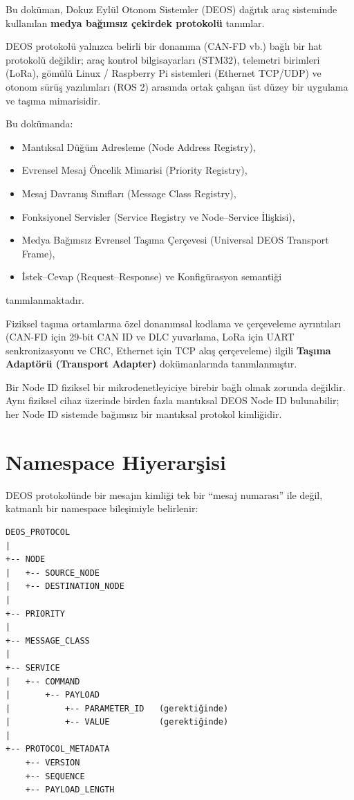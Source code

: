 \documentclass[a4paper,10pt]{article}
\begin{document}
Bu doküman, Dokuz Eylül Otonom Sistemler (DEOS) dağıtık araç sisteminde kullanılan \textbf{medya bağımsız çekirdek protokolü} tanımlar.

DEOS protokolü yalnızca belirli bir donanıma (CAN-FD vb.) bağlı bir hat protokolü değildir; araç kontrol bilgisayarları (STM32), telemetri birimleri (LoRa), gömülü Linux / Raspberry Pi sistemleri (Ethernet TCP/UDP) ve otonom sürüş yazılımları (ROS 2) arasında ortak çalışan üst düzey bir uygulama ve taşıma mimarisidir.

Bu dokümanda:
\begin{itemize}
    \item Mantıksal Düğüm Adresleme (Node Address Registry),
    \item Evrensel Mesaj Öncelik Mimarisi (Priority Registry),
    \item Mesaj Davranış Sınıfları (Message Class Registry),
    \item Fonksiyonel Servisler (Service Registry ve Node--Service İlişkisi),
    \item Medya Bağımsız Evrensel Taşıma Çerçevesi (Universal DEOS Transport Frame),
    \item İstek--Cevap (Request--Response) ve Konfigürasyon semantiği
\end{itemize}
tanımlanmaktadır.

Fiziksel taşıma ortamlarına özel donanımsal kodlama ve çerçeveleme ayrıntıları (CAN-FD için 29-bit CAN ID ve DLC yuvarlama, LoRa için UART senkronizasyonu ve CRC, Ethernet için TCP akış çerçeveleme) ilgili \textbf{Taşıma Adaptörü (Transport Adapter)} dokümanlarında tanımlanmıştır.

Bir Node ID fiziksel bir mikrodenetleyiciye birebir bağlı olmak zorunda değildir. Aynı fiziksel cihaz üzerinde birden fazla mantıksal DEOS Node ID bulunabilir; her Node ID sistemde bağımsız bir mantıksal protokol kimliğidir.

\section{Namespace Hiyerarşisi}

DEOS protokolünde bir mesajın kimliği tek bir ``mesaj numarası'' ile değil, katmanlı bir namespace bileşimiyle belirlenir:

\begin{verbatim}
DEOS_PROTOCOL
|
+-- NODE
|   +-- SOURCE_NODE
|   +-- DESTINATION_NODE
|
+-- PRIORITY
|
+-- MESSAGE_CLASS
|
+-- SERVICE
|   +-- COMMAND
|       +-- PAYLOAD
|           +-- PARAMETER_ID   (gerektiğinde)
|           +-- VALUE          (gerektiğinde)
|
+-- PROTOCOL_METADATA
    +-- VERSION
    +-- SEQUENCE
    +-- PAYLOAD_LENGTH
\end{verbatim}
\end{document}
